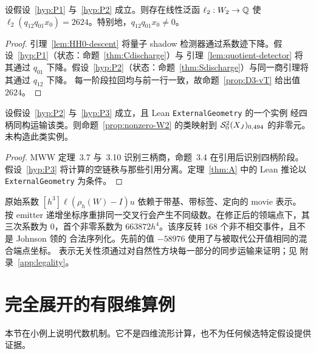 \begin{proposition}[商后抽象非零类]\label{prop:nonzero-W2}
设假设~\ref{hyp:P1} 与~\ref{hyp:P2} 成立。则存在线性泛函 $\ell_2:W_2\to\mathbb{Q}$ 使
$\ell_2(q_{12}q_{01}x_0)=2624$。特别地，$q_{12}q_{01}x_0\ne0$。
\end{proposition}

\begin{proof}
引理~\ref{lem:HH0-descent} 将量子 shadow 检测器通过系数迹下降。假设~\ref{hyp:P1}（状态：命题~\ref{thm:Cdischarge}）与
引理~\ref{lem:quotient-detector} 将其通过 $q_{01}$ 下降。假设~\ref{hyp:P2}（状态：命题~\ref{thm:Sdischarge}）与同一商引理将其通过 $q_{12}$ 下降。
每一阶段拉回均与前一行一致，故命题~\ref{prop:D3-vT} 给出值 $2624$。
\end{proof}

\begin{proposition}[闭候选类]\label{prop:closed-class}
设假设~\ref{hyp:P2} 与~\ref{hyp:P3} 成立，且 Lean \texttt{ExternalGeometry} 的一个实例
经四柄同构运输该类。则命题~\ref{prop:nonzero-W2} 的类映射到
$\mathcal{S}^{2}_{0}(X_J)_{0,494}$ 的非零元。未构造此类实例。
\end{proposition}

\begin{proof}
MWW 定理~3.7 与~3.10 识别三柄商，命题~3.4 在引用后识别四柄阶段。
假设~\ref{hyp:P3} 将计算的空链秩与那些引用分离。定理~\ref{thm:A} 中的 Lean 推论以
\texttt{ExternalGeometry} 为条件。
\end{proof}

\begin{remark}[表示与序列化依赖]\label{rem:serialization}
原始系数 $[h^3]\ell(\rho_h(W)-I)u$ 依赖于带基、带标签、定向的 movie 表示。
按 emitter 递增坐标序重排同一交叉行会产生不同级数。在修正后的领端点下，其三次系数为
$0$，首个非零系数为 $663872h^4$。该序反转 $168$ 个非不相交事件，且不是 Johnson 领的
合法序列化。先前的值 $-58976$ 使用了与被取代公开值相同的混合端点坐标。
表示无关性须通过对自然性方块每一部分的同步运输来证明；见
附录~\ref{app:legality}。
\end{remark}

\section{完全展开的有限维算例}\label{sec:toy-example}

本节在小例上说明代数机制。它不是四维流形计算，也不为任何候选特定假设提供证据。


